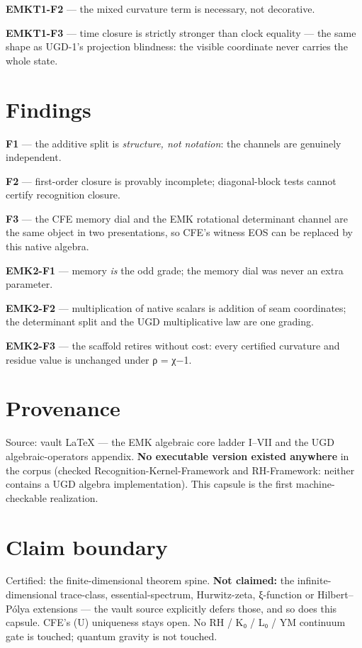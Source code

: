 \textbf{EMKT1-F2} --- the mixed curvature term is necessary, not decorative.

\textbf{EMKT1-F3} --- time closure is strictly stronger than clock equality --- the
same shape as UGD-1's projection blindness: the visible coordinate never
carries the whole state.

\hypertarget{findings}{%
\section{Findings}\label{findings}}

\textbf{F1} --- the additive split is \emph{structure, not notation}: the channels are
genuinely independent.

\textbf{F2} --- first-order closure is provably incomplete; diagonal-block tests
cannot certify recognition closure.

\textbf{F3} --- the CFE memory dial and the EMK rotational determinant channel are
the same object in two presentations, so CFE's witness EOS can be
replaced by this native algebra.

\textbf{EMK2-F1} --- memory \emph{is} the odd grade; the memory dial was never an extra
parameter.

\textbf{EMK2-F2} --- multiplication of native scalars is addition of seam
coordinates; the determinant split and the UGD multiplicative law are one
grading.

\textbf{EMK2-F3} --- the scaffold retires without cost: every certified curvature
and residue value is unchanged under ρ = χ−1.

\hypertarget{provenance}{%
\section{Provenance}\label{provenance}}

Source: vault LaTeX --- the EMK algebraic core ladder I--VII and the UGD
algebraic-operators appendix. \textbf{No executable version existed anywhere}
in the corpus (checked Recognition-Kernel-Framework and RH-Framework:
neither contains a UGD algebra implementation). This capsule is the first
machine-checkable realization.

\hypertarget{claim-boundary}{%
\section{Claim boundary}\label{claim-boundary}}

Certified: the finite-dimensional theorem spine. \textbf{Not claimed:} the
infinite-dimensional trace-class, essential-spectrum, Hurwitz-zeta,
ξ-function or Hilbert--Pólya extensions --- the vault source explicitly
defers those, and so does this capsule. CFE's (U) uniqueness stays open.
No RH / K₀ / L₀ / YM continuum gate is touched; quantum gravity is not
touched.

